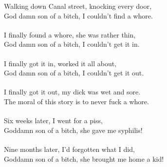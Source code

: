 
            Walking down Canal street, knocking every door,  \\
            God damn son of a bitch, I couldn't find a whore. \\
\hspace{10mm} \\
            I finally found a whore, she was rather thin,  \\
            God damn son of a bitch, I couldn't get it in. \\
\hspace{10mm} \\
            I finally got it in, worked it all about,  \\
            God damn son of a bitch, I couldn't get it out. \\
\hspace{10mm} \\
            I finally got it out, my dick was wet and sore.  \\
            The moral of this story is to never fuck a whore. \\
\hspace{10mm} \\
            Six weeks later, I went for a piss,  \\
            Goddamn son of a bitch, she gave me syphilis! \\
\hspace{10mm} \\
            Nine months later, I'd forgotten what I did,  \\
            Goddamn son of a bitch, she brought me home a kid! \\
